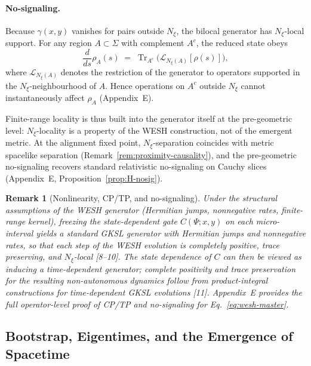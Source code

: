 \documentclass[12pt,a4paper]{article}
\newtheorem{remark}{Remark}[section]
\renewcommand{\Tr}{\operatorname{Tr}}
\numberwithin{equation}{section}
\begin{document}
\paragraph{No-signaling.}
Because $\gamma(x,y)$ vanishes for pairs outside $N_\xi$, the bilocal generator has
$N_\xi$-local support. For any region $A\subset\Sigma$ with complement $A^c$,
the reduced state obeys
\begin{equation}
\frac{d}{ds}\rho_A(s)\;=\;\Tr_{A^c}\big(\mathcal L_{N_\xi(A)}[\rho(s)]\big),
\label{eq:no-signaling}
\end{equation}
where $\mathcal L_{N_\xi(A)}$ denotes the restriction of the generator to operators
supported in the $N_\xi$-neighbourhood of $A$. Hence operations on $A^c$ outside $N_\xi$
cannot instantaneously affect $\rho_A$ (Appendix~E).

 \noindent Finite-range locality is thus built into the generator itself at the pre-geometric level: $N_\xi$-locality is a property of the WESH construction, not of the emergent metric. At the 
alignment fixed point, $N_\xi$-separation coincides with metric spacelike separation
(Remark~\ref{rem:proximity-causality}), and the pre-geometric no-signaling recovers
standard relativistic no-signaling on Cauchy slices (Appendix~E, Proposition~\ref{prop:H-nosig}).

\begin{remark}[Nonlinearity, CP/TP, and no-signaling]
\label{rem:nonlinear-cp}
Under the structural assumptions of the WESH generator (Hermitian jumps, nonneg\-ative rates, finite-range kernel), freezing the state-dependent
gate $C(\Psi;x,y)$ on each micro-interval yields a standard GKSL generator
with Hermitian jumps and nonnegative rates, so that each step of the WESH
evolution is completely positive, trace preserving, and $N_\xi$-local [8--10]. The state dependence of $C$ can then be viewed as inducing a
time-dependent generator; complete positivity and trace preservation for the
resulting non-autonomous dynamics follow from product-integral constructions
for time-dependent GKSL evolutions [11]. Appendix~E
provides the full operator-level proof of CP/TP and no-signaling for
Eq.~\eqref{eq:wesh-master}.
\end{remark}

\subsection{Bootstrap, Eigentimes, and the Emergence of Spacetime}
\label{sec:eigentime-bootstrap}
\end{document}
